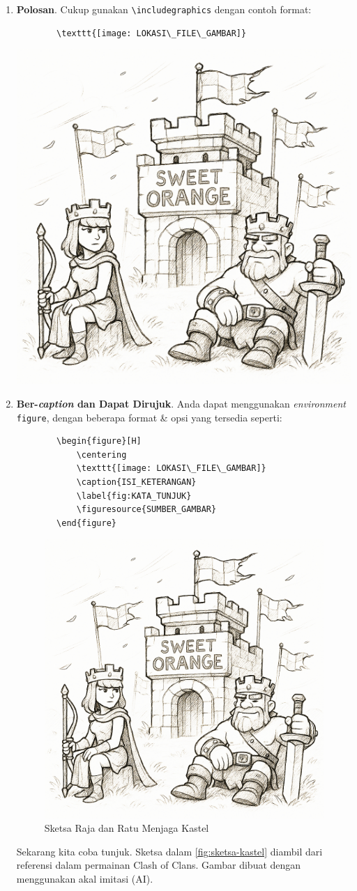 \begin{enumerate}[]
    \item \textbf{Polosan}. Cukup gunakan \verb|\includegraphics| dengan contoh format:
    \begin{lstlisting}
        \texttt{[image: LOKASI\_FILE\_GAMBAR]}
    \end{lstlisting}
    
    \begin{center}
        \includegraphics[width=.5\linewidth]{image/Sweet Orange Castle.jpg}
    \end{center}
    
    \item \textbf{Ber-\textit{caption} dan Dapat Dirujuk}. Anda dapat menggunakan \textit{environment} \texttt{figure}, dengan beberapa format \& opsi yang tersedia seperti:
    \begin{lstlisting}
        \begin{figure}[H]
            \centering
            \texttt{[image: LOKASI\_FILE\_GAMBAR]}
            \caption{ISI_KETERANGAN}
            \label{fig:KATA_TUNJUK}
            \figuresource{SUMBER_GAMBAR}
        \end{figure}
    \end{lstlisting}
    
    \begin{figure}[H]
        \centering
        \includegraphics[width=.5\linewidth]{image/Sweet Orange Castle.jpg}
        \caption{Sketsa Raja dan Ratu Menjaga Kastel}
        \label{fig:sketsa-kastel}
    \end{figure}
    
    Sekarang kita coba tunjuk. Sketsa dalam \autoref{fig:sketsa-kastel} diambil dari referensi dalam permainan Clash of Clans. Gambar dibuat dengan menggunakan akal imitasi (AI).
\end{enumerate}

